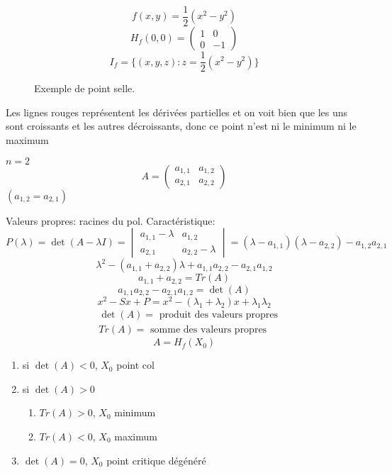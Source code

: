 \begin{eg}
   \[
   f(x, y) = \frac{1}{2}(x^2 - y^2)
   \]  
   \[
       H_f(0, 0) = \begin{pmatrix} 1 & 0\\ 0 & -1 \end{pmatrix} 
   \] 
   \[
       I_f = \{(x, y, z): z = \frac{1}{2}(x^2 - y^2)\}
   \] 
\begin{figure}[H]
    \centering
    \caption{Exemple de point selle.}
    \label{fig:exemple-point-selle}
\end{figure}
Les lignes rouges représentent les dérivées partielles et on voit bien que les uns sont croissants et les autres décroissants, donc ce point n'est ni le minimum ni le maximum
\end{eg}

\begin{eg}
$n = 2$
 \[
A = \begin{pmatrix} 
    a_{1,1} & a_{1, 2}\\
    a_{2, 1} & a_{2, 2}
\end{pmatrix} 
\] 
$(a_{1,2} = a_{2, 1})$
\par
Valeurs propres: racines du pol. Caractéristique:  
\[
    P(\lambda) = \det(A - \lambda I) = \begin{vmatrix} a_{1,1} - \lambda & a_{1, 2} \\ a_{2, 1} & a_{2,2} - \lambda \end{vmatrix} = (\lambda - a_{1,1})(\lambda - a_{2,2}) -  a_{1,2}a_{2,1}
\] 
\[
    \lambda^2 - (a_{1,1} + a_{2,2})\lambda + a_{1,1}a_{2,2} - a_{2,1}a_{1,2}
\] 
\[
    a_{1,1} + a_{2,2} = Tr(A)
\] 
\[
    a_{1,1}a_{2,2} - a_{2,1}a_{1,2} = \det(A)
\] 
\[
    x^2 - Sx + P = x^2 - (\lambda_1 + \lambda_2)x + \lambda_1\lambda_2
\] 
\begin{align*}
    &\det(A) = \text{ produit des valeurs propres}\\
    &Tr(A) = \text{ somme des valeurs propres}
\end{align*}
\[
A = H_f(X_0)
\] 
\begin{enumerate}
    \item si $\det(A) < 0$,  $X_0$ point col
    \item si $\det(A) > 0$
         \begin{enumerate}
            \item $Tr(A) > 0$, $X_0$ minimum
            \item  $Tr(A) < 0$, $X_0$ maximum
        \end{enumerate}
    \item $\det(A) = 0$,  $X_0$ point critique dégénéré
\end{enumerate}
\end{eg}

